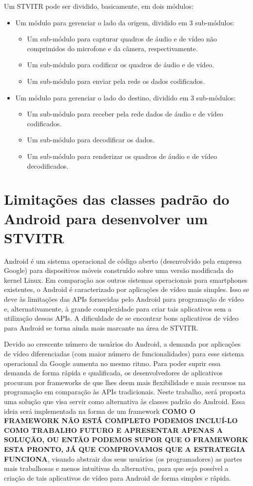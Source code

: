 \documentclass{acm_proc_article-sp}
\newcommand{\todo}[1]{\textcolor[rgb]{1.00,0.00,0.00}{\bf \uppercase{#1}}}
\begin{document}
Um STVITR pode ser dividido, basicamente, em dois módulos:
\begin{itemize}
 \item Um módulo para gerenciar o lado da origem, dividido em 3 sub-módulos:
 \begin{itemize}
  \item Um sub-módulo para capturar quadros de áudio e de vídeo não comprimidos do microfone e da câmera, respectivamente.
  \item Um sub-módulo para codificar os quadros de áudio e de vídeo.
  \item Um sub-módulo para enviar pela rede os dados codificados.
 \end{itemize}
 \item Um módulo para gerenciar o lado do destino, dividido em 3 sub-módulos:
 \begin{itemize}
  \item Um sub-módulo para receber pela rede dados de áudio e de vídeo codificados.
  \item Um sub-módulo para decodificar os dados.
  \item Um sub-módulo para renderizar os quadros de áudio e de vídeo decodificados.
 \end{itemize}
\end{itemize}

\section{Limitações das classes padrão do Android para desenvolver um STVITR}

Android é um sistema operacional de código aberto (desenvolvido pela empresa Google) para dispositivos móveis construído sobre uma versão modificada do kernel Linux. Em comparação aos outros sistemas operacionais para smartphones existentes, o Android é caracterizado por aplicações de vídeo mais simples. Isso se deve às limitações das APIs fornecidas pelo Android para programação de vídeo e, alternativamente, à grande complexidade para criar tais aplicativos sem a utilização dessas APIs. A dificuldade de se encontrar bons aplicativos de vídeo para Android se torna ainda mais marcante na área de STVITR.

Devido ao crescente número de usuários do Android, a demanda por aplicações de vídeo diferenciadas (com maior número de funcionalidades) para esse sistema operacional da Google aumenta no mesmo ritmo. Para poder suprir essa demanda de forma rápida e qualificada, os desenvolvedores de aplicativos procuram por  frameworks de que lhes deem mais flexibilidade e mais recursos na programação em comparação às APIs tradicionais. Neste trabalho, será proposta uma solução que visa servir como alternativa às classes padrão do Android. Essa ideia será implementada na forma de um framework \todo{como o framework não está completo podemos incluí-lo como trabalho futuro e apresentar apenas a solução, ou então podemos supor que o framework esta pronto, já que comprovamos que a estrategia funciona}, visando abstrair dos seus usuários (os programadores) as partes mais trabalhosas e menos intuitivas da alternativa, para que seja possível a criação de tais aplicativos de vídeo para Android de forma simples e rápida.
\end{document}
